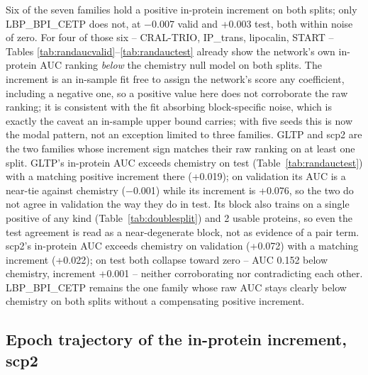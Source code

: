 Six of the seven families hold a positive in-protein increment on both splits; only
LBP\_BPI\_CETP does not, at $-$0.007 valid and +0.003 test, both within noise of zero.
For four of those six -- CRAL-TRIO, IP\_trans, lipocalin, START -- Tables
\ref{tab:randaucvalid}--\ref{tab:randauctest} already show the network's own in-protein
AUC ranking \emph{below} the chemistry null model on both splits. The increment is an
in-sample fit free to assign the network's score any coefficient, including a negative
one, so a positive value here does not corroborate the raw ranking; it is consistent with
the fit absorbing block-specific noise, which is exactly the caveat an in-sample upper
bound carries; with five seeds this is now the modal pattern, not an exception limited to
three families. GLTP and scp2 are the two families whose increment sign matches their
raw ranking on at least one split. GLTP's in-protein AUC exceeds chemistry on test
(Table~\ref{tab:randauctest}) with a matching positive increment there (+0.019); on
validation its AUC is a near-tie against chemistry ($-$0.001) while its increment is
+0.076, so the two do not agree in validation the way they do in test. Its block also
trains on a single positive of any kind (Table~\ref{tab:doublesplit}) and 2 usable
proteins, so even the test agreement is read as a near-degenerate block, not as evidence
of a pair term. scp2's in-protein AUC exceeds chemistry on validation (+0.072) with a
matching increment (+0.022); on test both collapse toward zero -- AUC 0.152 below
chemistry, increment +0.001 -- neither corroborating nor contradicting each other.
LBP\_BPI\_CETP remains the one family whose raw AUC stays clearly below chemistry on
both splits without a compensating positive increment.

\subsection{Epoch trajectory of the in-protein increment, scp2}


